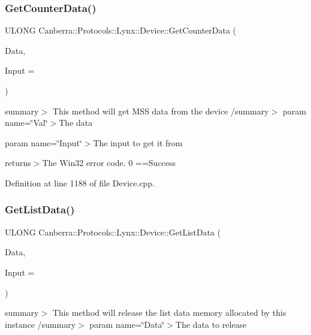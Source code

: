 \subsubsection{\texorpdfstring{Get\+Counter\+Data()}{GetCounterData()}}
{\footnotesize\ttfamily U\+L\+O\+NG Canberra\+::\+Protocols\+::\+Lynx\+::\+Device\+::\+Get\+Counter\+Data (\begin{DoxyParamCaption}\item[{\hyperlink{class_canberra_1_1_data_types_1_1_spectroscopy_1_1_counter_data}{Canberra\+::\+Data\+Types\+::\+Spectroscopy\+::\+Counter\+Data} \&}]{Data,  }\item[{U\+S\+H\+O\+RT}]{Input = {} }\end{DoxyParamCaption})}

summary$>$ This method will get M\+SS data from the device /summary$>$ param name=\char`\"{}\+Val\char`\"{}$>$The data

param name=\char`\"{}\+Input\char`\"{}$>$The input to get it from

returns$>$The Win32 error code. 0 ==Success

Definition at line 1188 of file Device.\+cpp.

\mbox{\label{class_canberra_1_1_protocols_1_1_lynx_1_1_device_a7af58e6c130e27da33a02e46eddd0bab_a7af58e6c130e27da33a02e46eddd0bab}} 
\subsubsection{\texorpdfstring{Get\+List\+Data()}{GetListData()}}
{\footnotesize\ttfamily U\+L\+O\+NG Canberra\+::\+Protocols\+::\+Lynx\+::\+Device\+::\+Get\+List\+Data (\begin{DoxyParamCaption}\item[{\hyperlink{class_canberra_1_1_data_types_1_1_spectroscopy_1_1_list_data_base}{Canberra\+::\+Data\+Types\+::\+Spectroscopy\+::\+List\+Data\+Base} $\ast$$\ast$}]{Data,  }\item[{U\+S\+H\+O\+RT}]{Input = {} }\end{DoxyParamCaption})}

summary$>$ This method will release the list data memory allocated by this instance /summary$>$ param name=\char`\"{}\+Data\char`\"{}$>$The data to release


